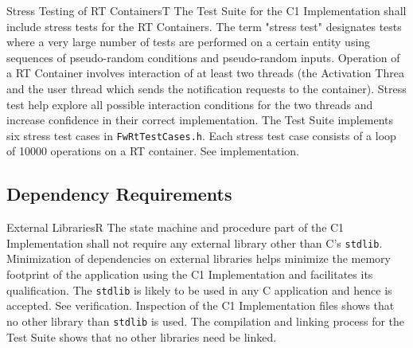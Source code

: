 \documentclass[requirements]{../fwprofile}
\begin{document}
\begin{fw_req_note}{Stress Testing of RT Containers}{T}
{The Test Suite for the C1 Implementation shall include stress tests for the RT Containers.}
{The term "stress test" designates tests where a very large number of tests are performed on a certain entity using sequences of pseudo-random conditions and pseudo-random inputs.}
{Operation of a RT Container involves interaction of at least two threads (the Activation Threa and the user thread which sends the notification requests to the container). Stress test help explore all possible interaction conditions for the two threads and increase confidence in their correct implementation.}
{The Test Suite implements six stress test cases in \texttt{FwRtTestCases.h}. Each stress test case consists of a loop of 10000 operations on a RT container.} 
{See implementation.}
\end{fw_req_note}



\subsection{Dependency Requirements}\label{req:dependencyReqs}

\begin{fw_req}{External Libraries}{R}
{The state machine and procedure part of the C1 Implementation shall not require any external library other than C's \texttt{stdlib}.}
{Minimization of dependencies on external libraries 
helps minimize the memory footprint of the application using 
the C1 Implementation and facilitates its qualification. 
The \texttt{stdlib} is likely to be used in any C application and hence is accepted.}
{See verification.} 
{Inspection of the C1 Implementation files shows that no other library than \texttt{stdlib} is used. 
The compilation and linking process for the Test Suite shows that no other libraries need be linked.}
\end{fw_req}
\end{document}

